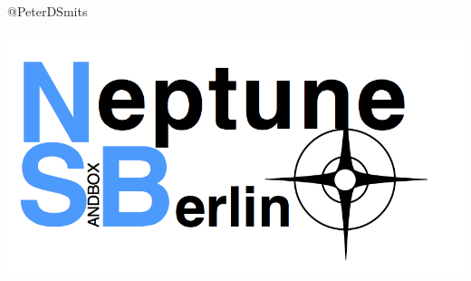 \documentclass[aspectratio=169]{beamer}
\begin{document}
\begin{frame}
\begin{columns}
\begin{column}{0.5\textwidth}
\begin{center}
        @PeterDSmits
      \end{center}

      \vspace*{0.02\textheight}

      \begin{center}
        \includegraphics[height=0.25\textheight,width=\textwidth,keepaspectratio=true]{figure/nsb_logo}
      \end{center}
    \end{column}
  \end{columns}
\end{frame}
\end{document}
